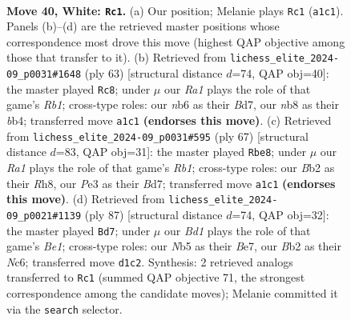 \documentclass[11pt]{article}
\begin{document}
\clearpage

\begin{figure}[p]\centering
\begin{subfigure}{0.46\textwidth}\centering
\resizebox{\linewidth}{!}{%
\newchessgame
\chessboard[
  setfen={1nb5/1p6/1nr2pk1/pN1p2p1/1b4Pp/1P2P2P/PB2PK2/R2B4 w - - 14 40},
  showmover=false,
  pgfstyle=straightmove, color=movearrow, markmove={a1-c1}
]}
\caption{}
\end{subfigure}\hfill
\begin{subfigure}{0.46\textwidth}\centering
\resizebox{\linewidth}{!}{%
\newchessgame
\chessboard[
  setfen={1r6/3b1p2/6k1/1p1Pbp1p/pB2p3/P3P1P1/1P1RBK1P/8 b - - 3 32},
  showmover=false,
  pgfstyle=straightmove, color=movearrow, markmove={b8-c8}
]}
\caption{}
\end{subfigure}
\\[4pt]
\begin{subfigure}{0.46\textwidth}\centering
\resizebox{\linewidth}{!}{%
\newchessgame
\chessboard[
  setfen={1r5r/3b4/1p1b1k2/p1pB1pp1/2Pp4/P2P1NP1/1P4KP/1R2R3 b - - 3 34},
  showmover=false,
  pgfstyle=straightmove, color=movearrow, markmove={b8-e8}
]}
\caption{}
\end{subfigure}\hfill
\begin{subfigure}{0.46\textwidth}\centering
\resizebox{\linewidth}{!}{%
\newchessgame
\chessboard[
  setfen={1r2b3/4bpk1/2n1p2p/3pP1pP/3P2P1/3NB1K1/5P2/R4B2 b - - 3 44},
  showmover=false,
  pgfstyle=straightmove, color=movearrow, markmove={e8-d7}
]}
\caption{}
\end{subfigure}
\caption{\textbf{Move 40, White: \texttt{Rc1}.} (a) Our position; Melanie plays \texttt{Rc1} (\texttt{a1c1}). Panels (b)--(d) are the retrieved master positions whose correspondence most drove this move (highest QAP objective among those that transfer to it). (b) Retrieved from \texttt{lichess\_elite\_2024-09\_p0031\#1648} (ply 63) [structural distance $d$=74, QAP obj=40]: the master played \texttt{Rc8}; under $\mu$ our \emph{Ra1} plays the role of that game's \emph{Rb1}; cross-type roles: our \emph{n}b6 as their \emph{B}d7, our \emph{n}b8 as their \emph{b}b4; transferred move \texttt{a1c1} \textbf{(endorses this move)}. (c) Retrieved from \texttt{lichess\_elite\_2024-09\_p0031\#595} (ply 67) [structural distance $d$=83, QAP obj=31]: the master played \texttt{Rbe8}; under $\mu$ our \emph{Ra1} plays the role of that game's \emph{Rb1}; cross-type roles: our \emph{B}b2 as their \emph{R}h8, our \emph{P}e3 as their \emph{B}d7; transferred move \texttt{a1c1} \textbf{(endorses this move)}. (d) Retrieved from \texttt{lichess\_elite\_2024-09\_p0021\#1139} (ply 87) [structural distance $d$=74, QAP obj=32]: the master played \texttt{Bd7}; under $\mu$ our \emph{Bd1} plays the role of that game's \emph{Be1}; cross-type roles: our \emph{N}b5 as their \emph{B}e7, our \emph{B}b2 as their \emph{N}c6; transferred move \texttt{d1c2}. Synthesis: 2 retrieved analogs transferred to \texttt{Rc1} (summed QAP objective 71, the strongest correspondence among the candidate moves); Melanie committed it via the \texttt{search} selector.}
\label{fig:thought-m78}
\end{figure}
\end{document}
